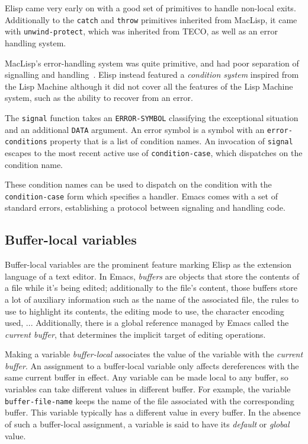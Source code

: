 \documentclass[format=acmsmall, review=false, screen=true]{acmart}
\newcommand \Elisp {Elisp}
\begin{document}
\Elisp{} came very early on with a good set of primitives to handle
non-local exits.  Additionally to the \texttt{catch} and \texttt{throw}
primitives inherited from MacLisp, it came with \texttt{unwind-protect},
which was inherited from TECO, as well as an error handling system.

MacLisp's error-handling system was quite primitive, and had poor separation
of signalling and handling~\cite{Pitman2001}.  \Elisp{} instead featured
a \emph{condition system} inspired from the Lisp Machine although it did
not cover all the features of the Lisp Machine system, such as the ability
to recover from an error.

The \texttt{signal} function takes an \texttt{ERROR-SYMBOL}
classifying the exceptional situation and an additional \texttt{DATA}
argument.  An error symbol is a symbol with an
\texttt{error-conditions} property that is a list of condition names.
An invocation of \texttt{signal} escapes to the most recent active use
of \texttt{condition-case}, which dispatches on the condition name.

These condition names can be used to dispatch on the condition with
the \texttt{condition-case} form which specifies a handler.  Emacs
comes with a set of standard errors, establishing a protocol between
signaling and handling code.

\subsection{Buffer-local variables}
\label{sec:buffer-local-variables}

Buffer-local variables are the prominent feature marking \Elisp{} as the
extension language of a text editor.  In Emacs, \emph{buffers} are objects
that store the contents of a file while it's being edited; additionally to
the file's content, those buffers store a lot of auxiliary information such
as the name of the associated file, the rules to use to highlight its
contents, the editing mode to use, the character encoding used, ...
Additionally, there is a global reference managed by Emacs called the
\emph{current buffer}, that determines the implicit target of
editing operations.

Making a variable \emph{buffer-local} associates the value of the variable
with the \emph{current buffer}.  An assignment to a buffer-local variable
only affects dereferences with the same current buffer in effect.
Any variable can be made local to any buffer, so variables can take
different values in different buffer.  For example, the variable
\texttt{buffer-file-name} keeps the name of the file associated with the
corresponding buffer.  This variable typically has a different value in
every buffer.  In the absence of such a buffer-local assignment, a variable
is said to have its \emph{default} or \emph{global} value.
\end{document}
